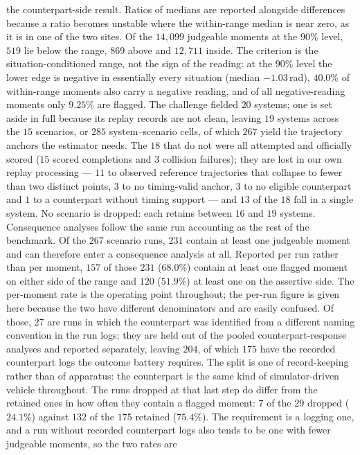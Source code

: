 \documentclass[12pt,a4paper]{article}
\begin{document}
the counterpart-side result. Ratios of medians are reported alongside differences because a ratio
becomes unstable where the within-range median is near zero, as it is in one of the two sites.
Of the $14{,}099$ judgeable
moments at the $90\%$ level, $519$ lie below the range, $869$ above and $12{,}711$ inside.
The criterion is the situation-conditioned range, not the sign of the reading: at the $90\%$ level the
lower edge is negative in essentially every situation (median $-1.03$\,rad), $40.0\%$ of within-range
moments also carry a negative reading, and of all negative-reading moments only $9.25\%$ are flagged.
The challenge fielded $20$ systems; one is set aside in full because its replay records are not
clean, leaving $19$ systems across the $15$ scenarios, or $285$ system--scenario cells, of which
$267$ yield the trajectory anchors the estimator needs. The $18$ that do not were all attempted and
officially scored ($15$ scored completions and $3$ collision failures); they are lost in our own
replay processing --- $11$ to observed reference trajectories that collapse to fewer than two
distinct points, $3$ to no timing-valid anchor, $3$ to no eligible counterpart and $1$ to a
counterpart without timing support --- and $13$ of the $18$ fall in a single system. No scenario is
dropped: each retains between $16$ and $19$ systems.
Consequence analyses follow the same run accounting as the rest of the benchmark. Of the $267$
scenario runs, $231$ contain at least one judgeable moment and can therefore enter a consequence
analysis at all. Reported per run rather than per moment, $157$ of those $231$ ($68.0\%$) contain at
least one flagged moment on either side of the range and $120$ ($51.9\%$) at least one on the
assertive side. The per-moment rate is the operating point throughout; the per-run figure is given
here because the two have different denominators and are easily confused. Of those, $27$ are runs in which the counterpart was identified from a different
naming convention in the run logs; they are held out of the pooled counterpart-response analyses and
reported separately, leaving $204$, of which $175$ have the recorded counterpart logs the outcome
battery requires. The split is one of record-keeping rather than of apparatus: the counterpart is
the same kind of simulator-driven vehicle throughout. The runs dropped at that last step do differ
from the retained ones in how often they contain a flagged moment: $7$ of the $29$ dropped ($24.1\%$)
against $132$ of the $175$ retained ($75.4\%$). The requirement is a logging one, and a run without
recorded counterpart logs also tends to be one with fewer judgeable moments, so the two rates are
\end{document}
